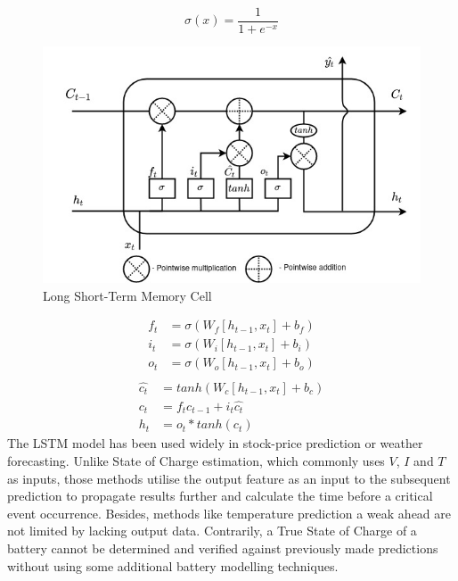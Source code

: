 %
%
\begin{equation}
    \sigma(x) = \frac{1}{1+e^{-x}}
    \label{eq:sigmoid}
\end{equation}
\begin{figure}[ht]%
    \centering
    \includegraphics[width=0.7\linewidth]{II_Body/LSTM/images/LSTM.jpg}
    \caption{Long Short-Term Memory Cell}
    \label{fig:LSTM-cell}
\end{figure}
\begin{equation}
    \begin{split}
        f_t &= \sigma \left(W_f \left[h_{t-1}, x_t \right] + b_f \right) \\
        i_t &= \sigma \left(W_i \left[h_{t-1}, x_t \right] + b_i \right) \\
        o_t &= \sigma \left(W_o \left[h_{t-1}, x_t \right] + b_o \right) \\    
    \end{split}
    \label{eq:LSTM-gates}
\end{equation}
\begin{equation}
    \begin{split}
        \hat{c_t} &= tanh \left(W_c \left[h_{t-1}, x_t \right] + b_c \right) \\
              c_t &= f_t c_{t-1}+i_t \hat{c_t} \\
              h_t &= o_t*tanh \left(c_t \right)
    \end{split}
    \label{eq:LSTM-output}
\end{equation}
The LSTM model has been used widely in stock-price prediction or weather forecasting.
Unlike State of Charge estimation, which commonly uses $V$, $I$ and $T$ as inputs, those methods utilise the output feature as an input to the subsequent prediction to propagate results further and calculate the time before a critical event occurrence.
Besides, methods like temperature prediction a weak ahead are not limited by lacking output data.
Contrarily, a True State of Charge of a battery cannot be determined and verified against previously made predictions without using some additional battery modelling techniques.


